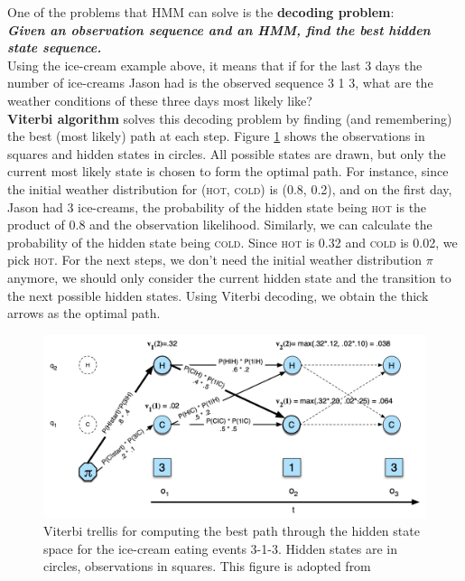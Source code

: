 \documentclass[nobib]{tufte-handout}
\begin{document}
One of the problems that HMM can solve is the \textbf{decoding problem}:\\
\bigskip
\textbf{\textit{Given an observation sequence and an HMM, find the best hidden state sequence.}}\\
\bigskip
Using the ice-cream example above, it means that if for the last 3 days the number of ice-creams Jason had is the observed sequence 3 1 3, what are the weather conditions of these three days most likely like?\\
\textbf{Viterbi algorithm} solves this decoding problem by finding (and remembering) the best (most likely) path at each step. Figure \ref{fig:vi} shows the observations in squares and hidden states in circles. All possible states are drawn, but only the current most likely state is chosen to form the optimal path. For instance, since the initial weather distribution for (\textsc{hot}, \textsc{cold}) is (0.8, 0.2), and on the first day, Jason had 3 ice-creams, the probability of the hidden state being \textsc{hot} is the product of 0.8 and the observation likelihood. Similarly, we can calculate the probability of the hidden state being \textsc{cold}. Since \textsc{hot} is 0.32 and \textsc{cold} is 0.02, we pick \textsc{hot}. For the next steps, we don't need the initial weather distribution $\pi$ anymore, we should only consider the current hidden state and the transition to the next possible hidden states. Using Viterbi decoding, we obtain the thick arrows as the optimal path.

\begin{figure}
 \includegraphics[width=1\textwidth]{viterbi.png}
  \caption{Viterbi trellis for computing the best path through the hidden state space for the ice-cream eating events 3-1-3. Hidden states are in circles, observations in squares. This figure is adopted from \cite{slp}}
  \label{fig:vi}
\end{figure}
\end{document}

